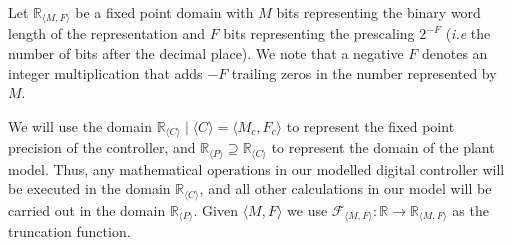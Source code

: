 \documentclass[sigconf]{llncs}
\begin{document}
Let $\mathbb{R}_{\langle M,F \rangle}$ be a fixed point domain with $M$ bits
representing the binary word length of the representation and $F$ bits
representing the prescaling $2^{-F}$ (\emph{i.e} the number of bits after
the decimal place).  We note that a negative $F$ denotes an integer
multiplication that adds $-F$ trailing zeros in the number represented by
$M$.

We will use the domain $\mathbb{R}_{\langle C \rangle} \mid \langle C \rangle = \langle M_c,F_c \rangle$
to represent the fixed point precision of the controller, and 
$\mathbb{R}_{\langle P \rangle} \supseteq \mathbb{R}_{\langle C \rangle}$
to represent the domain of the plant model.
Thus, any mathematical operations in our modelled digital controller will be executed in the
domain $\mathbb{R}_{\langle C \rangle}$, and all other calculations
in our model will be carried out in the domain $\mathbb{R}_{\langle P \rangle}$.
Given ${\langle M,F \rangle}$ we use $\mathcal{F}_{\langle M,F \rangle} : \mathbb{R} \rightarrow \mathbb{R}_{\langle M,F \rangle}$ as the truncation function.





\end{document}
